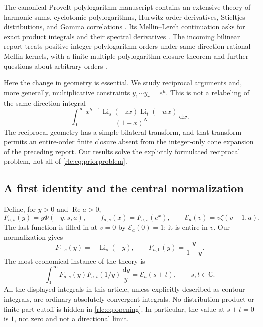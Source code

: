 \documentclass[11pt,a4paper]{article}
\numberwithin{equation}{section}
\theoremstyle{definition}\newtheorem{definition}[theorem]{Definition}
\theoremstyle{remark}\newtheorem{remark}[theorem]{Remark}
\DeclareMathOperator{\Li}{Li}
\DeclareMathOperator{\Rea}{Re}
\newcommand{\dd}{\,\mathrm d}
\newcommand{\C}{\mathbb C}\newcommand{\R}{\mathbb R}\newcommand{\N}{\mathbb N}
\newcommand{\E}{\mathcal E}
\begin{document}
The canonical ProveIt polylogarithm manuscript contains an extensive theory of harmonic sums, cyclotomic
polylogarithms, Hurwitz order derivatives, Stieltjes distributions,
and Gamma correlations \cite{Repo}. Its Mellin--Lerch continuation asks
for exact product integrals and their spectral derivatives \cite{MLD}.
The incoming bilinear report treats positive-integer polylogarithm
orders under same-direction rational Mellin kernels, with a finite
multiple-polylogarithm closure theorem and further questions about
arbitrary orders \cite{BMH}.

Here the change in geometry is essential. We study reciprocal arguments
and, more generally, multiplicative constraints
$y_1\cdots y_r=e^\mu$. This is not a relabeling of the same-direction
integral
\begin{equation}\label{rlc:eq:priorproblem}
 \int_0^\infty \frac{x^{b-1}\Li_s(-zx)\Li_t(-wx)}{(1+x)^N}\dd x.
\end{equation}
The reciprocal geometry has a simple bilateral transform, and that
transform permits an entire-order finite closure absent from the
integer-only cone expansion of the preceding report. Our results
solve the explicitly formulated reciprocal problem, not all of
\eqref{rlc:eq:priorproblem}.

\subsection{A first identity and the central normalization}
Define, for $y>0$ and $\Rea a>0$,
\begin{equation}\label{rlc:eq:profile}
 F_{a,s}(y)=y\Phi(-y,s,a),\qquad
 f_{a,s}(x)=F_{a,s}(e^x),\qquad
 \E_a(v)=v\zeta(v+1,a).
\end{equation}
The last function is filled in at $v=0$ by $\E_a(0)=1$; it is entire
in $v$. Our normalization gives
\begin{equation}\label{rlc:eq:specialprofiles}
 F_{1,s}(y)=-\Li_s(-y),\qquad
 F_{a,0}(y)=\frac{y}{1+y}.
\end{equation}
The most economical instance of the theory is
\begin{equation}\label{rlc:eq:opening}
 \boxed{\displaystyle
 \int_0^\infty F_{a,s}(y)F_{a,t}(1/y)\frac{\dd y}{y}
      =\E_a(s+t),\qquad s,t\in\C.}
\end{equation}
All the displayed integrals in this article, unless explicitly described
as contour integrals, are ordinary absolutely convergent integrals.
No distribution product or finite-part cutoff is hidden in
\eqref{rlc:eq:opening}. In particular, the value at $s+t=0$ is $1$, not
zero and not a directional limit.
\end{document}
